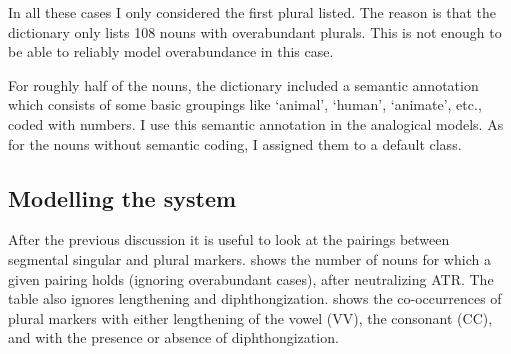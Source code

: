 In all these cases I only considered the first plural listed. The reason is that the dictionary only lists 108 nouns with overabundant plurals. This is not enough to be able to reliably model overabundance in this case.

For roughly half of the nouns, the dictionary included a semantic annotation which consists of some basic groupings like `animal', `human', `animate', etc., coded with numbers. I use this semantic annotation in the analogical models. As for the nouns without semantic coding, I assigned them to a default class.

\subsection{Modelling the system}

After the previous discussion it is useful to look at the pairings between segmental singular and plural markers.  shows the number of nouns for which a given pairing holds (ignoring overabundant cases), after neutralizing ATR. The table also ignores lengthening and diphthongization.  shows the co-occurrences of plural markers with either lengthening of the vowel (VV), the consonant (CC), and with the presence or absence of diphthongization.

